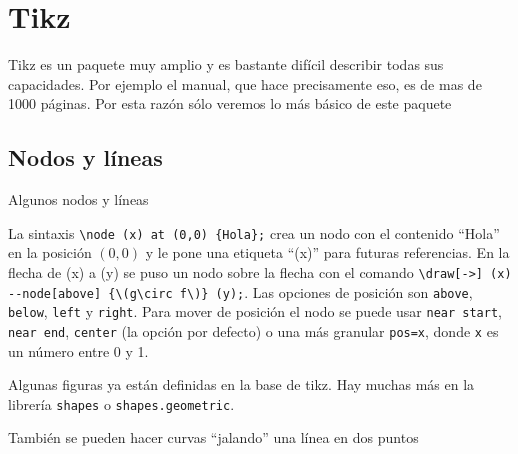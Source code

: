 
\chapter{Tikz}
Tikz es un paquete muy amplio y es bastante difícil describir todas sus
capacidades. Por ejemplo el manual, que hace precisamente eso, es de mas de
1000 páginas. Por esta razón sólo veremos lo más básico de este paquete

\section{Nodos y líneas}%
\label{sec:basic}
Algunos nodos y líneas
\begin{center}
\end{center}
La sintaxis \verb|\node (x) at (0,0) {Hola};| crea un nodo con el contenido
``Hola'' en la posición \((0,0)\) y le pone una etiqueta ``(x)'' para futuras
referencias. En la flecha de (x) a (y) se puso un nodo sobre la flecha con
el comando \verb|\draw[->] (x) --node[above] {\(g\circ f\)} (y);|. Las
opciones de posición son \texttt{above}, \texttt{below}, \texttt{left} y
\texttt{right}. Para mover de posición el nodo se puede usar \texttt{near
start}, \texttt{near end}, \texttt{center} (la opción por defecto) o una más
granular \texttt{pos=x}, donde \texttt{x} es un número entre 0 y 1.

Algunas figuras ya están definidas en la base de tikz. Hay muchas más en la
librería \texttt{shapes} o \texttt{shapes.geometric}.
\begin{center}
\end{center}

También se pueden hacer curvas ``jalando'' una línea en dos puntos
\begin{center}
\end{center}

